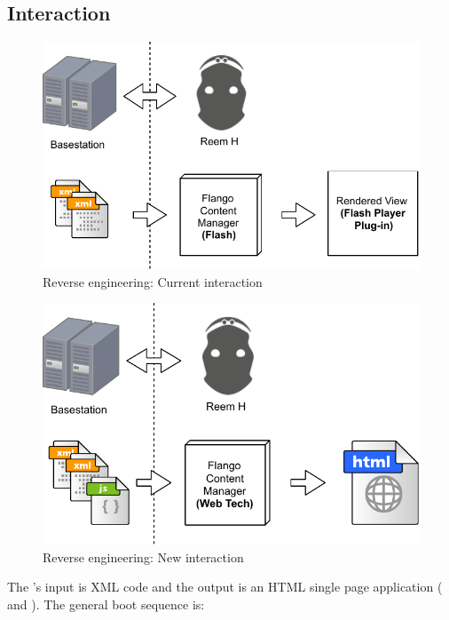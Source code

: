 \FloatBarrier

\subsection{Interaction} 
\label{sec:interaction}
\begin{figure}[htb]
   \centering
   \includegraphics{figures/interaction-original.pdf}
   \caption{Reverse engineering: Current interaction}
    \label{fig:interaction-original}
\end{figure}

\begin{figure}[htb]
    \centering
    \includegraphics{figures/interaction-new.pdf}
    \caption{Reverse engineering: New interaction}
    \label{fig:interaction-new}
\end{figure}

The \cm 's input is \ac{XML} code and the output is an \ac{HTML} single page application ( and ).
The general boot sequence is:


